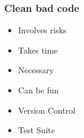\begin{frame}
  \frametitle{Clean bad code}
  \begin{minipage}[t]{0.48\linewidth}
    \begin{itemize}
        \item Involves risks\pause
        \item Takes time\pause
        \item Necessary\pause
        \item Can be fun\pause
    \end{itemize}
  \end{minipage}\hfill
  \begin{minipage}[t]{0.48\linewidth}
      \begin{itemize}
          \item Version Control\pause
          \item Test Suite
      \end{itemize}
  \end{minipage}
\end{frame}








